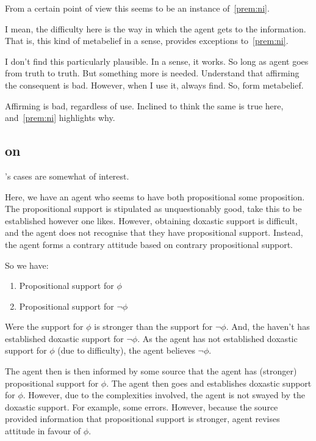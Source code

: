 \begin{note}[Reduction?]
  From a certain point of view this seems to be an instance of~\ref{prem:ni}.

  I mean, the difficulty here is the way in which the agent gets to the information.
  That is, this kind of metabelief in a sense, provides exceptions to~\ref{prem:ni}.

  I don't find this particularly plausible.
  In a sense, it works.
  So long as agent goes from truth to truth.
  But something more is needed.
  Understand that affirming the consequent is bad.
  However, when I use it, always find.
  So, form metabelief.

  Affirming is bad, regardless of use.
  Inclined to think the same is true here, and~\ref{prem:ni} highlights why.
\end{note}

\subsection{\citeauthor{Audi:1983ux} on \citeauthor{Lehrer:1971aa}}
\label{sec:lehrer}

\begin{note}[Lehrer]
  \citeauthor{Lehrer:1971aa}'s cases are somewhat of interest.

  Here, we have an agent who seems to have both propositional some proposition.
  The propositional support is stipulated as unquestionably good, take this to be established however one likes.
  However, obtaining doxastic support is difficult, and the agent does not recognise that they have propositional support.
  Instead, the agent forms a contrary attitude based on contrary propositional support.

  So we have:
  \begin{enumerate}
  \item\label{L:gl:prop:p} Propositional support for \(\phi\)
  \item\label{L:gl:prop:not-p} Propositional support for \(\lnot\phi\)
  \end{enumerate}
  Were the support for \(\phi\) is stronger than the support for \(\lnot\phi\).
  And, the haven't has established doxastic support for \(\lnot\phi\).
  As the agent has not established doxastic support for \(\phi\) (due to difficulty), the agent believes \(\lnot\phi\).

  The agent then is then informed by some source that the agent has (stronger) propositional support for \(\phi\).
  The agent then goes and establishes doxastic support for \(\phi\).
  However, due to the complexities involved, the agent is not swayed by the doxastic support.
  For example, some errors.
  However, because the source provided information that propositional support is stronger, agent revises attitude in favour of \(\phi\).
\end{note}

